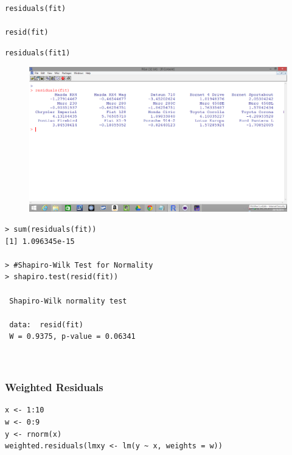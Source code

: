 \documentclass[residuals.tex]{subfiles}
\begin{document}
\begin{framed}
\begin{verbatim}
residuals(fit)

resid(fit)
\end{verbatim}
\end{framed}
\begin{framed}
\begin{verbatim}
residuals(fit1)
\end{verbatim}
\end{framed}
\begin{figure}[h!]
\centering
\includegraphics[width=0.9\linewidth]{screenshot1}
\caption{}
\label{fig:screenshot1}
\end{figure}
\begin{verbatim}
> sum(residuals(fit))
[1] 1.096345e-15

> #Shapiro-Wilk Test for Normality
> shapiro.test(resid(fit))
 
 Shapiro-Wilk normality test
 
 data:  resid(fit)
 W = 0.9375, p-value = 0.06341
 
 
\end{verbatim}

\newpage
\subsubsection*{Weighted Residuals}
\begin{framed}
\begin{verbatim}
x <- 1:10
w <- 0:9
y <- rnorm(x)
weighted.residuals(lmxy <- lm(y ~ x, weights = w))
\end{verbatim}
\end{framed}
\end{document}
